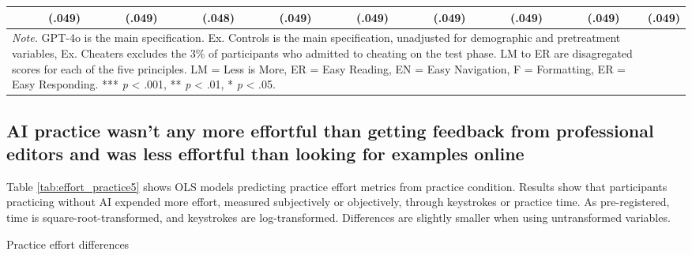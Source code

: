 \documentclass[11pt]{report}
\begin{document}
\begin{append}
\begin{landscape}
\begin{table}[]
\begin{tabular}{lccccccccc}
{} & {(.049)} & {(.049)} & {(.048)} & {(.049)} & {(.049)} & {(.049)} & {(.049)} & {(.049)} & {(.049)} \\ 
\midrule
\multicolumn{9}{p{14cm}}{\textit{Note.} GPT-4o is the main specification. Ex. Controls is the main specification, unadjusted for demographic and pretreatment variables, Ex. Cheaters excludes the 3\% of participants who admitted to cheating on the test phase. LM to ER are disagregated scores for each of the five principles. LM = Less is More, ER = Easy Reading, EN = Easy Navigation, F = Formatting, ER = Easy Responding.  *** \textit{p} < .001, ** \textit{p} < .01, * \textit{p} < .05.}
    \end{tabular}
    \label{tab:test_effects_s5}
\end{table}
\end{landscape}

\subsection{AI practice wasn’t any more effortful than getting feedback from professional editors and was less effortful than looking for examples online}

Table \ref{tab:effort_practice5} shows OLS models predicting practice effort metrics from practice condition. Results show that participants practicing without AI expended more effort, measured subjectively or objectively, through keystrokes or practice time. As pre-registered, time is square-root-transformed, and keystrokes are log-transformed. Differences are slightly smaller when using untransformed variables.

\begin{landscape}

\begin{table}[]
    \centering
    \caption{Practice effort differences}


\end{table}
\end{landscape}
\end{append}
\end{document}
